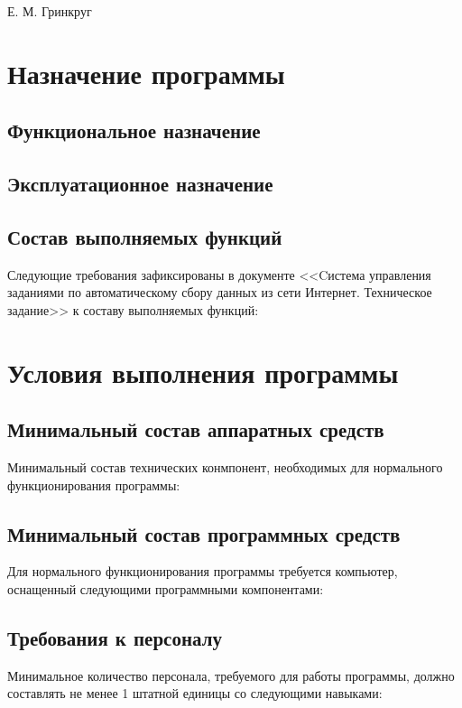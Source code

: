 \documentclass[a4paper,12pt]{article}
\begin{document}
	
	{Е. М. Гринкруг}
	
	\firstPage
	\newpage
	\secondPage
	\newpage
	\thirdPage
	\newpage
	\section{Назначение программы}
	\subsection{Функциональное назначение}
	
	\subsection{Эксплуатационное назначение}
	
	\subsection{Состав выполняемых функций}
	Следующие требования зафиксированы в документе <<Cистема управления заданиями по автоматическому сбору данных из сети Интернет. Техническое задание>> к составу выполняемых функций:
	
	
	\newpage
	\section{Условия выполнения программы}
	\subsection{Минимальный состав аппаратных средств}
	Минимальный состав технических конмпонент, необходимых для нормального функционирования программы:
	
	\subsection{Минимальный состав программных средств}
	Для нормального функционирования программы требуется компьютер, оснащенный следующими программными компонентами:
	
	\subsection{Требования к персоналу}
	Минимальное количество персонала, требуемого для работы программы, должно составлять не менее 1 штатной единицы со следующими навыками:    
    
\end{document}
